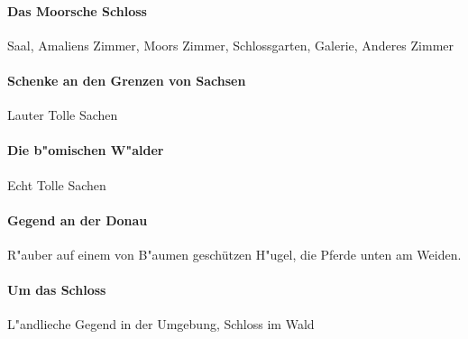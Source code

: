 \paragraph{Das Moorsche Schloss}
Saal, Amaliens Zimmer, Moors Zimmer, Schlossgarten, Galerie, Anderes Zimmer
\paragraph{Schenke an den Grenzen von Sachsen}
Lauter Tolle Sachen
\paragraph{Die b"omischen W"alder}
Echt Tolle Sachen
\paragraph{Gegend an der Donau}
R"auber auf einem von B"aumen geschützen H"ugel, die Pferde unten am Weiden.
\paragraph{Um das Schloss}
L"andlieche Gegend in der Umgebung, Schloss im Wald